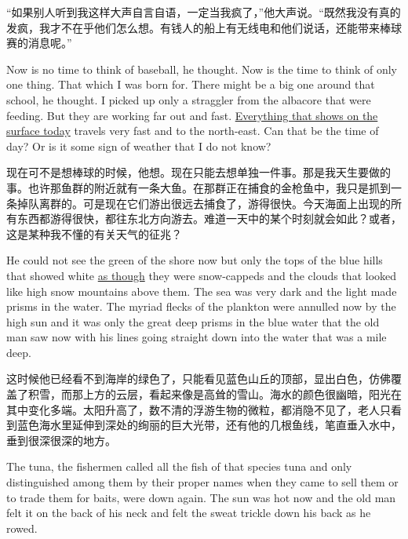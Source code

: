 \begin{paracol}{2}
\switchcolumn

“如果别人听到我这样大声自言自语，一定当我疯了，”他大声说。“既然我没有真的发疯，我才不在乎他们怎么想。有钱人的船上有无线电和他们说话，还能带来棒球赛的消息呢。”

\switchcolumn*

Now is no time to think of baseball, he thought. Now is the time to think of
only one thing. That which I was born for. There might be a big one around
that school, he thought. I picked up only a \gls{straggler} from the
albacore that were feeding. But they are working far out and fast.
\uline{Everything that shows on the surface today} travels very fast and to the
north-east. Can that be the time of day? Or is it some \gls{sign} of weather that
I do not know?

\switchcolumn

现在可不是想棒球的时候，他想。现在只能去想单独一件事。那是我天生要做的事。也许那鱼群的附近就有一条大鱼。在那群正在捕食的金枪鱼中，我只是抓到一条掉队离群的。可是现在它们游出很远去捕食了，游得很快。今天海面上出现的所有东西都游得很快，都往东北方向游去。难道一天中的某个时刻就会如此？或者，这是某种我不懂的有关天气的征兆？

\switchcolumn*

He could not see the green of the shore now but only the tops of the blue
hills that showed white \uline{as though} they were snow-\glspl{capped} and the
clouds that looked like high snow mountains above them. The sea was very
dark and the light made \glspl{prism} in the water. The \gls{myriad}
\glspl{fleck} of the plankton were \gls{annulled} now by the high sun and it
was only the great deep prisms in the blue water that the old man saw now
with his lines going straight down into the water that was a mile deep.

\switchcolumn

这时候他已经看不到海岸的绿色了，只能看见蓝色山丘的顶部，显出白色，仿佛覆盖了积雪，而那上方的云层，看起来像是高耸的雪山。海水的颜色很幽暗，阳光在其中变化多端。太阳升高了，数不清的浮游生物的微粒，都消隐不见了，老人只看到蓝色海水里延伸到深处的绚丽的巨大光带，还有他的几根鱼线，笔直垂入水中，垂到很深很深的地方。

\switchcolumn*

The tuna, the fishermen called all the fish of that \gls{species} tuna and
only \gls{distinguished} \gls{among} them by their proper names when they
came to sell them or to trade them for baits, were down again. The sun was
hot now and the old man felt it on the back of his neck and felt the \gls{sweat}
\gls{trickle} down his back as he rowed.


\end{paracol}
